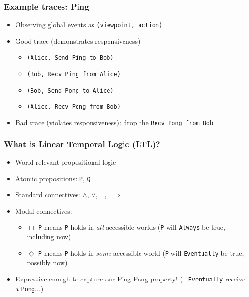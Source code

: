 \documentclass[12pt,aspectratio=169]{beamer}
\begin{document}
\begin{frame}
\frametitle{Example traces: Ping}
\begin{itemize}
  \item Observing global events as \texttt{(viewpoint, action)}
  \item Good trace (demonstrates responsiveness)
  \begin{itemize}
    \item \texttt{(Alice, Send Ping to Bob)}
    \item \texttt{(Bob, Recv Ping from Alice)}
    \item \texttt{(Bob, Send Pong to Alice)}
    \item \texttt{(Alice, Recv Pong from Bob)}
  \end{itemize}
  \item Bad trace (violates responsiveness): drop the \texttt{Recv Pong from Bob}
\end{itemize}
\end{frame}

\begin{frame}
\frametitle{What is Linear Temporal Logic (LTL)?}
\begin{itemize}
  \item World-relevant propositional logic
  \item Atomic propositions: \texttt{P}, \texttt{Q}
  \item Standard connectives: $\land$, $\lor$, $\neg$, $\implies$
  \item Modal connectives:
  \begin{itemize}
    \item $\Box$ \texttt{P} means \texttt{P} holds in \textit{all} accessible worlds
    \newline (\texttt{P} will \texttt{Always} be true, including now)
    \item $\Diamond$ \texttt{P} means \texttt{P} holds in \textit{some} accessible world
    \newline (\texttt{P} will \texttt{Eventually} be true, possibly now)
  \end{itemize}
  \item Expressive enough to capture our Ping-Pong property!
  \newline (...\texttt{Eventually} receive a \texttt{Pong}...)
\end{itemize}
\end{frame}
\end{document}

